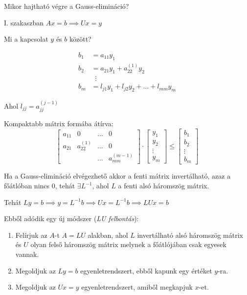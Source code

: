 \begin{kerdes}
    Mikor hajtható végre a Gauss-elimináció?
\end{kerdes}
I. szakaszban $Ax = b \implies Ux = y$

\begin{kerdes}
    Mi a kapcsolat $y$ és $b$ között?
\end{kerdes}
\begin{align*}
    b_{1} & = a_{11}y_{1} \\
    b_{2} & = a_{21}y_{1} + a_{22}^{(1)}y_{2} \\
    &\;\; \vdots \\
    b_{m} & = l_{j 1}y_{1} + l_{j 2}y_{2} + \dots + l_{m m}y_{m}
\end{align*}

Ahol $l_{jj} = a_{jj}^{(j-1)}$

Kompaktabb mátrix formába átírva:
$$
\begin{bmatrix}
a_{11} & 0 & \dots & 0 \\
a_{21} & a_{22}^{(1)} & \dots & 0 \\
& & \dots & a_{mm}^{(m-1)}
\end{bmatrix}
\cdot
\begin{bmatrix}
y_{1} \\
y_{2} \\
\vdots \\
y_{m}
\end{bmatrix}
\leq
\begin{bmatrix}
b_{1} \\
b_{2} \\
\vdots \\
b_{m}
\end{bmatrix}
$$

Ha a Gauss-elimináció elvégezhető akkor a fenti mátrix invertálható, azaz a főátlóban nincs $0$, tehát $\exists L^{-1}$, ahol $L$ a fenti alsó háromszög mátrix.

Tehát $Ly = b \implies y = L^{-1}b \implies Ux = L^{-1}b \implies LU x = b$

Ebből adódik egy új módszer (\textit{LU felbontás}):
\begin{enumerate}
    \item Felírjuk az $A$-t $A = LU$ alakban, ahol $L$ invertálható alsó háromszög mátrix és $U$ olyan felső háromszög mátrix melynek a főátlójában csak egyesek vannak.
    \item Megoldjuk az $Ly = b$ egyenletrendszert, ebből kapunk egy értéket $y$-ra.
    \item Megoldjuk az $Ux = y$ egyenletrendszert, amiből megkapjuk $x$-et.
\end{enumerate}

